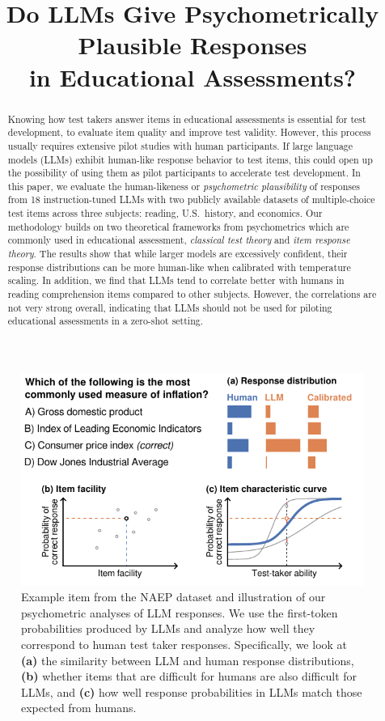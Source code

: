 \documentclass[11pt]{article}
\title{Do LLMs Give Psychometrically Plausible Responses \\ in Educational Assessments?}
\author{}
\begin{document}
\maketitle
\begin{abstract}
  Knowing how test takers answer items in educational assessments is essential for test development, to evaluate item quality and improve test validity. However, this process usually requires extensive pilot studies with human participants. If large language models (LLMs) exhibit human-like response behavior to test items, this could open up the possibility of using them as pilot participants to accelerate test development. In this paper, we evaluate the human-likeness or \emph{psychometric plausibility} of responses from 18 instruction-tuned LLMs with two publicly available datasets of multiple-choice test items across three subjects: reading, U.S.\ history, and economics. Our methodology builds on two theoretical frameworks from psychometrics which are commonly used in educational assessment, \emph{classical test theory} and \emph{item response theory}. The results show that while larger models are excessively confident, their response distributions can be more human-like when calibrated with temperature scaling. In addition, we find that LLMs tend to correlate better with humans in reading comprehension items compared to other subjects. However, the correlations are not very strong overall, indicating that LLMs should not be used for piloting educational assessments in a zero-shot setting.
\end{abstract}


\begin{figure}
  \centering
  \includegraphics[width=\columnwidth]{figures/example.pdf}
  \caption{Example item from the NAEP dataset and illustration of our psychometric analyses of LLM responses. We use the first-token probabilities produced by LLMs and analyze how well they correspond to human test taker responses. Specifically, we look at \textbf{(a)} the similarity between LLM and human response distributions, \textbf{(b)} whether items that are difficult for humans are also difficult for LLMs, and \textbf{(c)} how well response probabilities in LLMs match those expected from humans.}
  \label{fig:example}
\end{figure}
\end{document}
